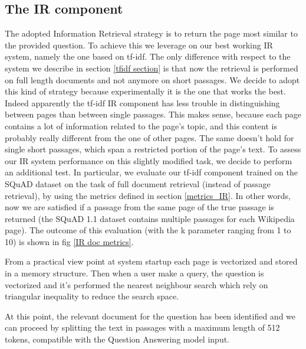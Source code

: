 \documentclass{article}
\begin{document}
\subsection{The IR component}
The adopted Information Retrieval strategy is to return the page most similar to the provided question. To achieve this we leverage on our best working IR system, namely the one based on tf-idf. The only difference with respect to the system we describe in section \ref{tfidf section} is that now the retrieval is performed on full length documents and not anymore on short passages. We decide to adopt this kind of strategy because experimentally it is the one that works the best. Indeed apparently the tf-idf IR component has less trouble in distinguishing between pages than between single passages. This makes sense, because each page contains a lot of information related to the page's topic, and this content is probably really different from the one of other pages. The same doesn't hold for single short passages, which span a restricted portion of the page's text. 
To assess our IR system performance on this slightly modified task, we decide to perform an additional test. In particular, we evaluate our tf-idf component trained on the SQuAD dataset on the task of full document retrieval (instead of passage retrieval), by using the metrics defined in section \ref{metrics_IR}. In other words, now we are satisfied if a passage from the same page of the true passage is returned (the SQuAD 1.1 dataset contains multiple passages for each Wikipedia page). The outcome of this evaluation (with the k parameter ranging from 1 to 10) is shown in fig \ref{IR doc metrics}.

From a practical view point at system startup each page is vectorized and stored in a memory structure. Then when a user make a query, the question is vectorized and it's performed the nearest neighbour search which rely on triangular inequality to reduce the search space.

At this point, the relevant document for the question has been identified and we can proceed by splitting the text in passages with a maximum length of 512 tokens, compatible with the Question Answering model input.
\end{document}
